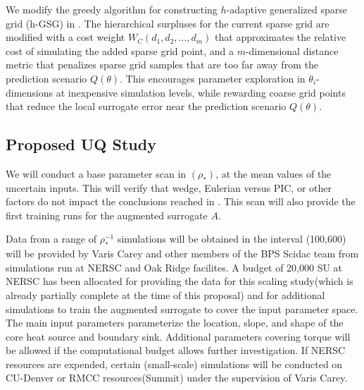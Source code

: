 We modify the 
greedy algorithm for constructing $h$-adaptive generalized sparse grid (h-GSG) in \cite{Jakeman2011LocalAD}.
The hierarchical surpluses for the current sparse grid are modified with a cost weight $W_C(d_1,d_2,\ldots,d_m)$ that approximates the relative
cost of simulating the added sparse grid point, and a $m$-dimensional distance metric that penalizes sparse grid
samples that are too far away from the prediction scenario $Q(\theta)$.  This encourages parameter exploration in $\theta_i$-dimensions at
inexpensive simulation levels, while rewarding coarse grid points that reduce the local surrogate error near the prediction scenario $Q(\theta)$.  

\subsection{Proposed UQ Study}
We will conduct a base parameter scan in $(\rho_*)$, at the mean values of the uncertain inputs.  This will verify that wedge, Eulerian versus PIC, or other factors do not impact the conclusions reached in \cite{Yas_Ido}.  This scan will also provide the first training runs for
the augmented surrogate $A$.  

Data from a range of $\rho^{-1}_*$ simulations will be obtained in the interval (100,600) will be provided by Varis Carey and other members
of the BPS Scidac team  from simulations run at NERSC and Oak Ridge facilites.  A budget of 20,000 SU at NERSC has been allocated for providing the data for this scaling study(which is already partially complete at the time of this proposal)
 and for additional simulations to train the augmented surrogate to cover the input parameter space.
The main input parameters parameterize the location, slope, and shape of the core heat source and boundary sink.  Additional parameters covering
torque will be allowed if the computational budget allows further investigation.  If NERSC resources are expended, certain (small-scale)
simulations will be conducted on CU-Denver or RMCC resources(Summit) under the supervision of Varis Carey.


 


 
